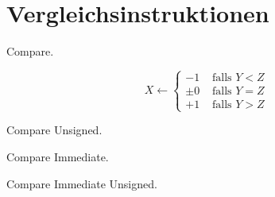 \section{Vergleichsinstruktionen}

\glqq Compare\grqq.

\[
    X \gets
    \begin{cases}
     -1 & \text{ falls } Y < Z \\
     \pm0 & \text{ falls } Y = Z  \\
     +1 & \text{ falls } Y > Z 
    \end{cases}
\]


\glqq Compare Unsigned\grqq.


\glqq Compare Immediate\grqq.


\glqq Compare Immediate Unsigned\grqq.


